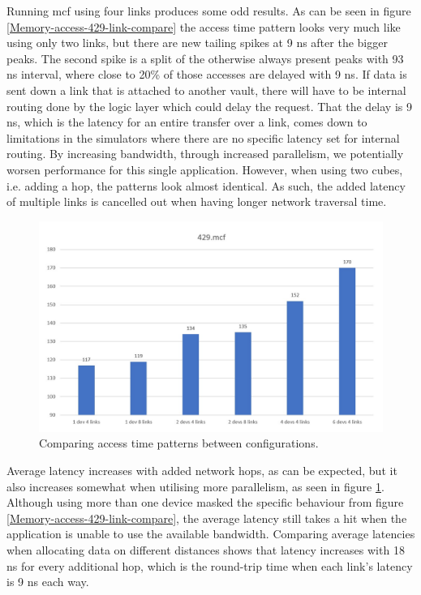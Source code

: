 Running mcf using four links produces some odd results. As can be seen in figure \ref{Memory-access-429-link-compare} the access time pattern looks very much like using only two links, but there are new tailing spikes at 9 ns after the bigger peaks. The second spike is a split of the otherwise always present peaks with 93 ns interval, where close to 20\% of those accesses are delayed with 9 ns. If data is sent down a link that is attached to another vault, there will have to be internal routing done by the logic layer which could delay the request. That the delay is 9 ns, which is the latency for an entire transfer over a link, comes down to limitations in the simulators where there are no specific latency set for internal routing. By increasing bandwidth, through increased parallelism, we potentially worsen performance for this single application. However, when using two cubes, i.e. adding a hop, the patterns look almost identical. As such, the added latency of multiple links is cancelled out when having longer network traversal time.
\bigskip

\begin{figure}[!ht]
    \centering
    \includegraphics[width=1.0\linewidth]{figure/429-averages.jpg}
    \caption{Comparing access time patterns between configurations.}
    \label{Memory-access-429-average-latency}
\end{figure}

Average latency increases with added network hops, as can be expected, but it also increases somewhat when utilising more parallelism, as seen in figure \ref{Memory-access-429-average-latency}. Although using more than one device masked the specific behaviour from figure \ref{Memory-access-429-link-compare}, the average latency still takes a hit when the application is unable to use the available bandwidth. Comparing average latencies when allocating data on different distances shows that latency increases with 18 ns for every additional hop, which is the round-trip time when each link's latency is 9 ns each way. 

